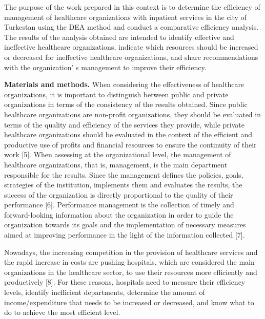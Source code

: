 \begin{multicols}{2}
The purpose of the work prepared in this context is to determine the
efficiency of management of healthcare organizations with inpatient
services in the city of Turkestan using the DEA method and conduct a
comparative efficiency analysis. The results of the analysis obtained
are intended to identify effective and ineffective healthcare
organizations, indicate which resources should be increased or decreased
for ineffective healthcare organizations, and share recommendations with
the organization' s management to improve their
efficiency.

{\bfseries Materials and methods.} When considering the effectiveness of
healthcare organizations, it is important to distinguish between public
and private organizations in terms of the consistency of the results
obtained. Since public healthcare organizations are non-profit
organizations, they should be evaluated in terms of the quality and
efficiency of the services they provide, while private healthcare
organizations should be evaluated in the context of the efficient and
productive use of profits and financial resources to ensure the
continuity of their work {[}5{]}. When assessing at the organizational
level, the management of healthcare organizations, that is, management,
is the main department responsible for the results. Since the management
defines the policies, goals, strategies of the institution, implements
them and evaluates the results, the success of the organization is
directly proportional to the quality of their performance {[}6{]}.
Performance management is the collection of timely and forward-looking
information about the organization in order to guide the organization
towards its goals and the implementation of necessary measures aimed at
improving performance in the light of the information collected {[}7{]}.

Nowadays, the increasing competition in the provision of healthcare
services and the rapid increase in costs are pushing hospitals, which
are considered the main organizations in the healthcare sector, to use
their resources more efficiently and productively {[}8{]}. For these
reasons, hospitals need to measure their efficiency levels, identify
inefficient departments, determine the amount of income/expenditure that
needs to be increased or decreased, and know what to do to achieve the
most efficient level.


\end{multicols}
